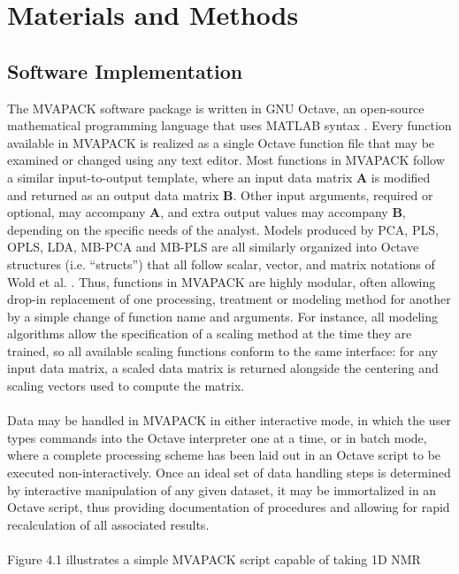 \section{Materials and Methods}

\subsection{Software Implementation}

\begin{doublespace}
The MVAPACK software package is written in GNU Octave, an open-source
mathematical programming language that uses MATLAB syntax \cite{eaton2008}.
Every function available in MVAPACK is realized as a single Octave function
file that may be examined or changed using any text editor. Most functions in
MVAPACK follow a similar input-to-output template, where an input data matrix
$\mathbf{A}$ is modified and returned as an output data matrix $\mathbf{B}$.
Other input arguments, required or optional, may accompany $\mathbf{A}$, and
extra output values may accompany $\mathbf{B}$, depending on the specific
needs of the analyst. Models produced by PCA, PLS, OPLS, LDA, MB-PCA and
MB-PLS are all similarly organized into Octave structures (i.e. ``structs'')
that all follow scalar, vector, and matrix notations of Wold et al.
\cite{wold:cils2001}. Thus, functions in MVAPACK are highly modular, often
allowing drop-in replacement of one processing, treatment or modeling method
for another by a simple change of function name and arguments. For instance,
all modeling algorithms allow the specification of a scaling method at the
time they are trained, so all available scaling functions conform to the
same interface: for any input data matrix, a scaled data matrix is returned
alongside the centering and scaling vectors used to compute the matrix.
\\\\
Data may be handled in MVAPACK in either interactive mode, in which the user
types commands into the Octave interpreter one at a time, or in batch mode,
where a complete processing scheme has been laid out in an Octave script to
be executed non-interactively. Once an ideal set of data handling steps is
determined by interactive manipulation of any given dataset, it may be
immortalized in an Octave script, thus providing documentation of procedures
and allowing for rapid recalculation of all associated results.
\\\\
Figure 4.1 illustrates a simple MVAPACK script capable of taking 1D \hnmr{} NMR

\end{doublespace}
